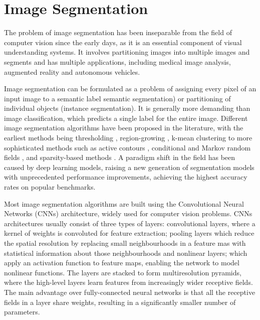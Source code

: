 \documentclass[a4paper,twoside,12pt]{book}
\begin{document}
\section{Image Segmentation}
The problem of image segmentation has been inseparable from the field of computer vision since the early days, as it is an essential component of visual understanding systems. It involves partitioning images into multiple images and segments and has multiple applications, including medical image analysis, augmented reality and autonomous vehicles.

Image segmentation can be formulated as a problem of assigning every pixel of an input image to a semantic label semantic segmentation) or partitioning of individual objects (instance segmentation). It is generally more demanding than image classification, which predicts a single label for the entire image. Different image segmentation algorithms have been proposed in the literature, with the earliest methods being thresholding \cite{otsu1979threshold}, region-growing \cite{nock2004statistical}, k-mean clustering \cite{dhanachandra2015image} to more sophisticated methods such as active contours \cite{kass1988snakes}, conditional and Markov random fields \cite{plath2009multi}, and sparsity-based methods \cite{starck2005image}. A paradigm shift in the field has been caused by deep learning models, raising a new generation of segmentation models with unprecedented performance improvements, achieving the highest accuracy rates on popular benchmarks.

Most image segmentation algorithms are built using the Convolutional Neural Networks (CNNs) architecture, widely used for computer vision problems. CNNs architectures usually consist of three types of layers: convolutional layers, where a kernel of weights is convoluted for feature extraction; pooling layers which reduce the spatial resolution by replacing small neighbourhoods in a feature mas with statistical information about those neighbourhoods and nonlinear layers; which apply an activation function to feature maps, enabling the network to model nonlinear functions. The layers are stacked to form multiresolution pyramids, where the high-level layers learn features from increasingly wider receptive fields. The main advantage over fully-connected neural networks is that all the receptive fields in a layer share weights, resulting in a significantly smaller number of parameters.
\end{document}
